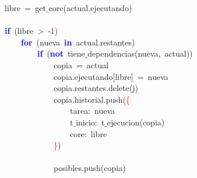 \mbox{}\ \ \ \ \ \ \ \ \ \ \ \ \ \ \ \ libre\ \textcolor{BrickRed}{=}\ get$\_$core\textcolor{BrickRed}{(}actual\textcolor{BrickRed}{.}ejecutando\textcolor{BrickRed}{)} \\
\mbox{} \\
\mbox{}\ \ \ \ \ \ \ \ \ \ \ \ \ \ \ \ \textbf{\textcolor{Blue}{if}}\ \textcolor{BrickRed}{(}libre\ \textcolor{BrickRed}{\textgreater{}}\ \textcolor{BrickRed}{-}\textcolor{Purple}{1}\textcolor{BrickRed}{)} \\
\mbox{}\ \ \ \ \ \ \ \ \ \ \ \ \ \ \ \ \ \ \ \ \textbf{\textcolor{Blue}{for}}\ \textcolor{BrickRed}{(}nueva\ \textbf{\textcolor{Blue}{in}}\ actual\textcolor{BrickRed}{.}restantes\textcolor{BrickRed}{)} \\
\mbox{}\ \ \ \ \ \ \ \ \ \ \ \ \ \ \ \ \ \ \ \ \ \ \ \ \textbf{\textcolor{Blue}{if}}\ \textcolor{BrickRed}{(}\textbf{\textcolor{Blue}{not}}\ tiene$\_$dependencias\textcolor{BrickRed}{(}nueva\textcolor{BrickRed}{,}\ actual\textcolor{BrickRed}{))} \\
\mbox{}\ \ \ \ \ \ \ \ \ \ \ \ \ \ \ \ \ \ \ \ \ \ \ \ \ \ \ \ copia\ \textcolor{BrickRed}{=}\ actual \\
\mbox{}\ \ \ \ \ \ \ \ \ \ \ \ \ \ \ \ \ \ \ \ \ \ \ \ \ \ \ \ copia\textcolor{BrickRed}{.}ejecutando\textcolor{BrickRed}{[}libre\textcolor{BrickRed}{]}\ \textcolor{BrickRed}{=}\ nueva \\
\mbox{}\ \ \ \ \ \ \ \ \ \ \ \ \ \ \ \ \ \ \ \ \ \ \ \ \ \ \ \ copia\textcolor{BrickRed}{.}restantes\textcolor{BrickRed}{.}delete\textcolor{BrickRed}{(}j\textcolor{BrickRed}{)} \\
\mbox{}\ \ \ \ \ \ \ \ \ \ \ \ \ \ \ \ \ \ \ \ \ \ \ \ \ \ \ \ copia\textcolor{BrickRed}{.}historial\textcolor{BrickRed}{.}push\textcolor{BrickRed}{(}\textcolor{Red}{\{} \\
\mbox{}\ \ \ \ \ \ \ \ \ \ \ \ \ \ \ \ \ \ \ \ \ \ \ \ \ \ \ \ \ \ \ \ tarea\textcolor{BrickRed}{:}\ nueva \\
\mbox{}\ \ \ \ \ \ \ \ \ \ \ \ \ \ \ \ \ \ \ \ \ \ \ \ \ \ \ \ \ \ \ \ t$\_$inicio\textcolor{BrickRed}{:}\ t$\_$ejecucion\textcolor{BrickRed}{(}copia\textcolor{BrickRed}{)} \\
\mbox{}\ \ \ \ \ \ \ \ \ \ \ \ \ \ \ \ \ \ \ \ \ \ \ \ \ \ \ \ \ \ \ \ core\textcolor{BrickRed}{:}\ libre \\
\mbox{}\ \ \ \ \ \ \ \ \ \ \ \ \ \ \ \ \ \ \ \ \ \ \ \ \ \ \ \ \textcolor{Red}{\}}\textcolor{BrickRed}{)} \\
\mbox{} \\
\mbox{}\ \ \ \ \ \ \ \ \ \ \ \ \ \ \ \ \ \ \ \ \ \ \ \ \ \ \ \ posibles\textcolor{BrickRed}{.}push\textcolor{BrickRed}{(}copia\textcolor{BrickRed}{)} \\

